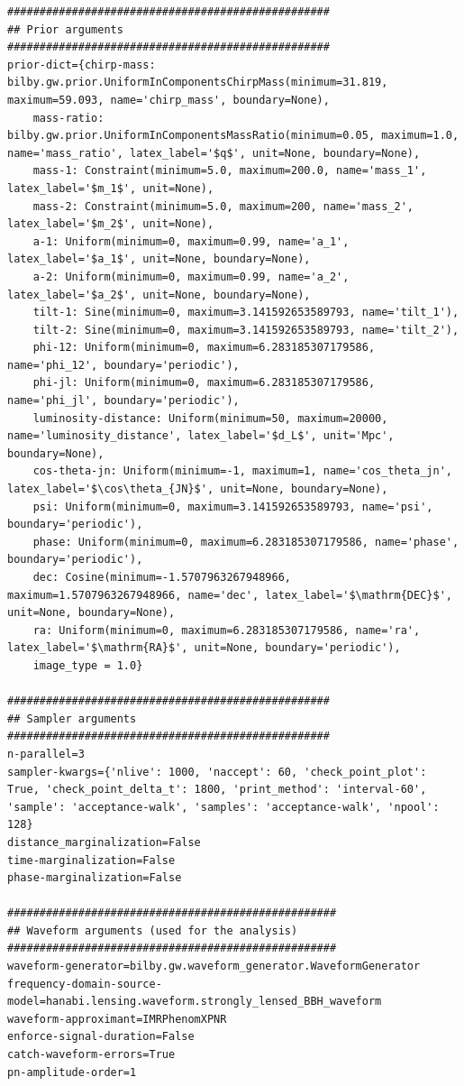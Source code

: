 \begin{lstlisting}[style=numpyStyle, caption={Single-image configuration file for image 1 of event \texttt{inj001}.}, label={lst:single_ini_example}]
##################################################
## Prior arguments
##################################################
prior-dict={chirp-mass: bilby.gw.prior.UniformInComponentsChirpMass(minimum=31.819, maximum=59.093, name='chirp_mass', boundary=None),
    mass-ratio: bilby.gw.prior.UniformInComponentsMassRatio(minimum=0.05, maximum=1.0, name='mass_ratio', latex_label='$q$', unit=None, boundary=None),
    mass-1: Constraint(minimum=5.0, maximum=200.0, name='mass_1', latex_label='$m_1$', unit=None),
    mass-2: Constraint(minimum=5.0, maximum=200, name='mass_2', latex_label='$m_2$', unit=None),
    a-1: Uniform(minimum=0, maximum=0.99, name='a_1', latex_label='$a_1$', unit=None, boundary=None),
    a-2: Uniform(minimum=0, maximum=0.99, name='a_2', latex_label='$a_2$', unit=None, boundary=None),
    tilt-1: Sine(minimum=0, maximum=3.141592653589793, name='tilt_1'),
    tilt-2: Sine(minimum=0, maximum=3.141592653589793, name='tilt_2'),
    phi-12: Uniform(minimum=0, maximum=6.283185307179586, name='phi_12', boundary='periodic'),
    phi-jl: Uniform(minimum=0, maximum=6.283185307179586, name='phi_jl', boundary='periodic'),
    luminosity-distance: Uniform(minimum=50, maximum=20000, name='luminosity_distance', latex_label='$d_L$', unit='Mpc', boundary=None),
    cos-theta-jn: Uniform(minimum=-1, maximum=1, name='cos_theta_jn', latex_label='$\cos\theta_{JN}$', unit=None, boundary=None),
    psi: Uniform(minimum=0, maximum=3.141592653589793, name='psi', boundary='periodic'),
    phase: Uniform(minimum=0, maximum=6.283185307179586, name='phase', boundary='periodic'),
    dec: Cosine(minimum=-1.5707963267948966, maximum=1.5707963267948966, name='dec', latex_label='$\mathrm{DEC}$', unit=None, boundary=None),
    ra: Uniform(minimum=0, maximum=6.283185307179586, name='ra', latex_label='$\mathrm{RA}$', unit=None, boundary='periodic'),
    image_type = 1.0}

##################################################
## Sampler arguments
##################################################
n-parallel=3
sampler-kwargs={'nlive': 1000, 'naccept': 60, 'check_point_plot': True, 'check_point_delta_t': 1800, 'print_method': 'interval-60', 'sample': 'acceptance-walk', 'samples': 'acceptance-walk', 'npool': 128}
distance_marginalization=False
time-marginalization=False
phase-marginalization=False

###################################################
## Waveform arguments (used for the analysis)
###################################################
waveform-generator=bilby.gw.waveform_generator.WaveformGenerator
frequency-domain-source-model=hanabi.lensing.waveform.strongly_lensed_BBH_waveform
waveform-approximant=IMRPhenomXPNR
enforce-signal-duration=False
catch-waveform-errors=True
pn-amplitude-order=1
\end{lstlisting}

